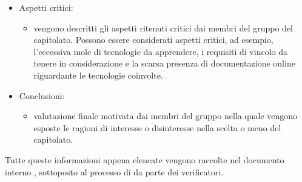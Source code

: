 \begin{itemize}
\begin{itemize}
	\end{itemize}
\item Aspetti critici:
	\begin{itemize}
	\item vengono descritti gli aspetti ritenuti critici dai membri del gruppo \Gruppo{} del capitolato.
	Possono essere considerati aspetti critici, ad esempio, l'eccessiva mole di tecnologie da apprendere, i requisiti di vincolo da tenere in considerazione e la scarsa presenza di documentazione online riguardante le tecnologie coinvolte.
	\end{itemize}
\item Conclusioni:
	\begin{itemize}
	\item valutazione finale motivata dai membri del gruppo \Gruppo{} nella quale vengono esposte le ragioni di interesse o disinteresse nella scelta o meno del capitolato.
	\end{itemize}
\end{itemize}
Tutte queste informazioni appena elencate vengono raccolte nel documento interno \glo{\SdF{}}, sottoposto al processo di  da parte dei verificatori.